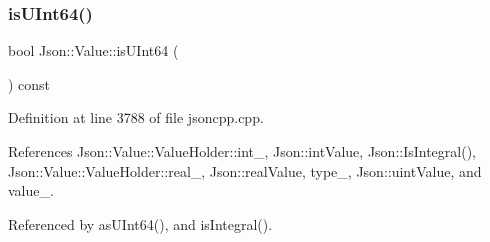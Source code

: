 \subsubsection{\texorpdfstring{is\+U\+Int64()}{isUInt64()}}
{\footnotesize\ttfamily bool Json\+::\+Value\+::is\+U\+Int64 (\begin{DoxyParamCaption}{ }\end{DoxyParamCaption}) const}



Definition at line 3788 of file jsoncpp.\+cpp.



References Json\+::\+Value\+::\+Value\+Holder\+::int\+\_\+, Json\+::int\+Value, Json\+::\+Is\+Integral(), Json\+::\+Value\+::\+Value\+Holder\+::real\+\_\+, Json\+::real\+Value, type\+\_\+, Json\+::uint\+Value, and value\+\_\+.



Referenced by as\+U\+Int64(), and is\+Integral().


